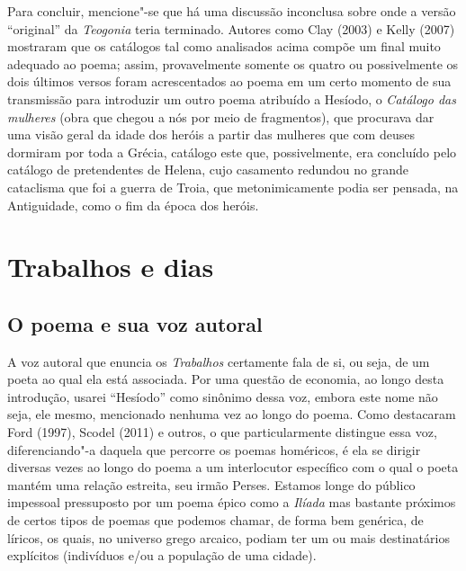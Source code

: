 Para concluir, mencione"-se que há uma discussão inconclusa sobre onde a
versão ``original'' da \emph{Teogonia} teria terminado. Autores como
Clay (2003) e Kelly (2007) mostraram que os catálogos tal como
analisados acima compõe um final muito adequado ao poema; assim,
provavelmente somente os quatro ou possivelmente os dois últimos versos
foram acrescentados ao poema em um certo momento de sua transmissão para
introduzir um outro poema atribuído a Hesíodo, o \emph{Catálogo das
mulheres} (obra que chegou a nós por meio de fragmentos), que procurava
dar uma visão geral da idade dos heróis a partir das mulheres que com
deuses dormiram por toda a Grécia, catálogo este que, possivelmente, era
concluído pelo catálogo de pretendentes de Helena, cujo casamento
redundou no grande cataclisma que foi a guerra de Troia, que
metonimicamente podia ser pensada, na Antiguidade, como o fim da época
dos heróis.

\section*{Trabalhos e dias}

\subsection{O poema e sua voz autoral}


A voz autoral que enuncia os \emph{Trabalhos} certamente fala de si, ou
seja, de um poeta ao qual ela está associada. Por uma questão de
economia, ao longo desta introdução, usarei ``Hesíodo'' como sinônimo
dessa voz, embora este nome não seja, ele mesmo, mencionado nenhuma vez
ao longo do poema. Como destacaram Ford (1997), Scodel (2011) e outros,
o que particularmente distingue essa voz, diferenciando"-a daquela que
percorre os poemas homéricos, é ela se dirigir diversas vezes ao longo
do poema a um interlocutor específico com o qual o poeta mantém uma
relação estreita, seu irmão Perses. Estamos longe do público impessoal
pressuposto por um poema épico como a \emph{Ilíada} mas bastante
próximos de certos tipos de poemas que podemos chamar, de forma bem
genérica, de líricos, os quais, no universo grego arcaico, podiam ter um
ou mais destinatários explícitos (indivíduos e/ou a população de uma
cidade).

